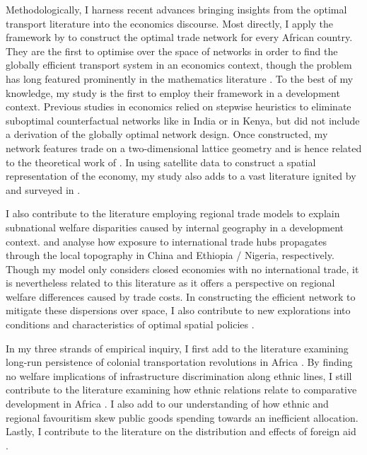 \documentclass[11pt, oneside]{article}   	%
\begin{document}
Methodologically, I harness recent advances bringing insights from the optimal transport literature into the economics discourse. Most directly, I apply the framework by \cite{fajgelbaum_optimal_2017} to construct the optimal trade network for every African country. They are the first to optimise over the space of networks in order to find the globally efficient transport system in an economics context, though the problem has long featured prominently in the mathematics literature \citep[for a textbook treatment, see][]{Bernot_OptimalTransportationNetworks_2009}. To the best of my knowledge, my study is the first to employ their framework in a development context. Previous studies in economics relied on stepwise heuristics to eliminate suboptimal counterfactual networks like \cite{alder_chinese_2017} in India or \cite{burgess_value_2015} in Kenya, but did not include a derivation of the globally optimal network design. Once constructed, my network features trade on a two-dimensional lattice geometry and is hence related to the theoretical work of \cite{allen_trade_2014,allen_welfare_2016}. In using satellite data to construct a spatial representation of the economy, my study also adds to a vast literature ignited by \cite{henderson_measuring_2012} and surveyed in \cite{donaldson_view_2016}.

I also contribute to the literature employing regional trade models to explain subnational welfare disparities caused by internal geography in a development context. \cite{cosar_internal_2016} and \cite{atkin_whos_2015} analyse how exposure to international trade hubs propagates through the local topography in China and Ethiopia / Nigeria, respectively. Though my model only considers closed economies with no international trade, it is nevertheless related to this literature as it offers a perspective on regional welfare differences caused by trade costs. In constructing the efficient network to mitigate these dispersions over space, I also contribute to new explorations into conditions and characteristics of optimal spatial policies \citep{Fajgelbaum_OptimalSpatialPolicies_2018}.

In my three strands of empirical inquiry, I first add to the literature examining long-run persistence of colonial transportation revolutions in Africa \citep{jedwab_permanent_2016,jedwab_history_2017}. By finding no welfare implications of infrastructure discrimination along ethnic lines, I still contribute to the literature examining how ethnic relations relate to comparative development in Africa \citep{michalopoulos_pre-colonial_2013,michalopoulos_national_2014,michalopoulos_long-run_2016}. I also add to our understanding of how ethnic \citep{DeLuca_Ethnicfavoritismaxiom_2018} and regional favouritism \citep{Hodler_RegionalFavoritism_2014,burgess_value_2015} skew public goods spending towards an inefficient allocation. Lastly, I contribute to the literature on the distribution and effects of foreign aid \citep{Clemens_CountingChickenswhen_2012,Nunn_USFoodAid_2014,Dreher_Aidgrowthregional_2015,Dreher_AidChinaGrowth_2017}.
\end{document}
